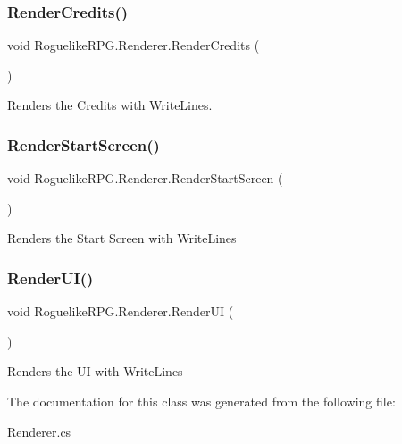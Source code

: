 \subsubsection{\texorpdfstring{Render\+Credits()}{RenderCredits()}}
{\footnotesize\ttfamily void Roguelike\+R\+P\+G.\+Renderer.\+Render\+Credits (\begin{DoxyParamCaption}{ }\end{DoxyParamCaption})\hspace{0.3cm}{\ttfamily [inline]}}



Renders the Credits with Write\+Line\textquotesingle{}s. 

\mbox{\label{class_roguelike_r_p_g_1_1_renderer_a271d86335afd2b6ef8c2ca673baecb21}} 
\subsubsection{\texorpdfstring{Render\+Start\+Screen()}{RenderStartScreen()}}
{\footnotesize\ttfamily void Roguelike\+R\+P\+G.\+Renderer.\+Render\+Start\+Screen (\begin{DoxyParamCaption}{ }\end{DoxyParamCaption})\hspace{0.3cm}{\ttfamily [inline]}}



Renders the Start Screen with Write\+Line\textquotesingle{}s 

\mbox{\label{class_roguelike_r_p_g_1_1_renderer_a74f7f40cef19e77afac474d526df9e43}} 
\subsubsection{\texorpdfstring{Render\+U\+I()}{RenderUI()}}
{\footnotesize\ttfamily void Roguelike\+R\+P\+G.\+Renderer.\+Render\+UI (\begin{DoxyParamCaption}{ }\end{DoxyParamCaption})\hspace{0.3cm}{\ttfamily [inline]}}



Renders the UI with Write\+Line\textquotesingle{}s 



The documentation for this class was generated from the following file\+:\begin{DoxyCompactItemize}
\item 
Renderer.\+cs\end{DoxyCompactItemize}
